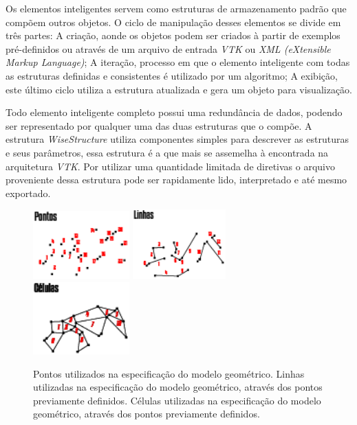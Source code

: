 \documentclass[
        english,			
        brazil			        %
        ,<...>]{abntbibufjf}
\begin{document}
 Os elementos inteligentes servem como estruturas de armazenamento padrão que compõem outros objetos. O ciclo de manipulação desses elementos se divide em três partes: A criação, aonde os objetos podem ser criados à partir de exemplos pré-definidos ou através de um arquivo de entrada \textit{VTK} ou \textit{XML (eXtensible Markup Language)}; A iteração, processo em que o elemento inteligente com todas as estruturas definidas e consistentes é utilizado por um algoritmo; A exibição,  este último ciclo utiliza a estrutura atualizada e gera um objeto para visualização.
 
Todo elemento inteligente completo possui uma redundância de dados, podendo ser representado por qualquer uma das duas estruturas que o compõe. A estrutura \textit{WiseStructure} utiliza componentes simples para descrever as estruturas e seus parâmetros, essa estrutura é a que mais se assemelha à encontrada na arquitetura \textit{VTK}. Por utilizar uma quantidade limitada de diretivas o arquivo proveniente dessa estrutura pode ser rapidamente lido, interpretado e até mesmo exportado.

\begin{figure}[!htbp]
	\includegraphics[width=0.33\textwidth]{Figures/WiseElementPoints.png}
	\includegraphics[width=0.32\textwidth]{Figures/WiseElementLines.png}
	\includegraphics[width=0.33\textwidth]{Figures/WiseElementCells.png}
	\caption{Pontos utilizados na especificação do modelo geométrico. Linhas utilizadas na especificação do modelo geométrico, através dos pontos previamente definidos. Células utilizadas na especificação do modelo geométrico, através dos pontos previamente definidos.}
	\label{fig2:wiselementstructs}
\end{figure}
\end{document}
